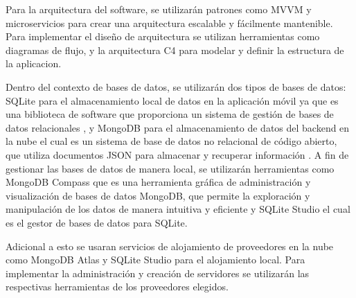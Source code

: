 \documentclass[runningheads]{llncs}
\begin{document}
Para la arquitectura del software, se utilizarán patrones como MVVM y microservicios para crear una arquitectura escalable y fácilmente mantenible. Para implementar el diseño de arquitectura se utilizan herramientas como diagramas de flujo, y la arquitectura C4 para modelar y definir la estructura de la aplicacion.

Dentro del contexto de bases de datos, se utilizarán dos tipos de bases de datos: SQLite para el almacenamiento local de datos en la aplicación móvil ya que es una biblioteca de software que proporciona un sistema de gestión de bases de datos relacionales \cite{Cita17}, y MongoDB para el almacenamiento de datos del backend en la nube el cual es un sistema de base de datos no relacional de código abierto, que utiliza documentos JSON para almacenar y recuperar información \cite{Cita18}. A fin de gestionar las bases de datos de manera local, se utilizarán herramientas como MongoDB Compass que es una herramienta gráfica de administración y visualización de bases de datos MongoDB, que permite la exploración y manipulación de los datos de manera intuitiva y eficiente y SQLite Studio el cual es el gestor de bases de datos para SQLite.

Adicional a esto se usaran servicios de alojamiento de proveedores en la nube como MongoDB Atlas y SQLite Studio para el alojamiento local. Para implementar la administración y creación de servidores se utilizarán las respectivas herramientas de los proveedores elegidos.



\end{document}
